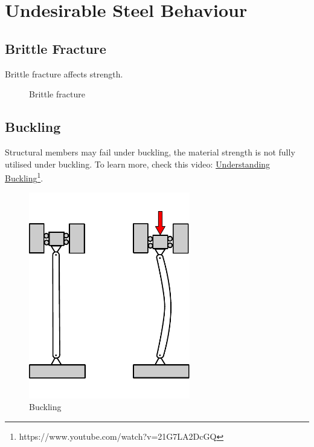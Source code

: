 \section{Undesirable Steel Behaviour}
\subsection{Brittle Fracture}
Brittle fracture affects strength.
\begin{figure}[H]
\centering

\caption{Brittle fracture}
\end{figure}
\subsection{Buckling}
Structural members may fail under buckling, the material strength is not fully utilised under buckling. To learn more, check this video: \href{https://www.youtube.com/watch?v=21G7LA2DcGQ}{Understanding Buckling}\footnote{https://www.youtube.com/watch?v=21G7LA2DcGQ}.
\begin{figure}[H]
\centering\includegraphics[height=9cm]{PIC/CH04/BUCKLING}
\caption{Buckling}
\end{figure}
